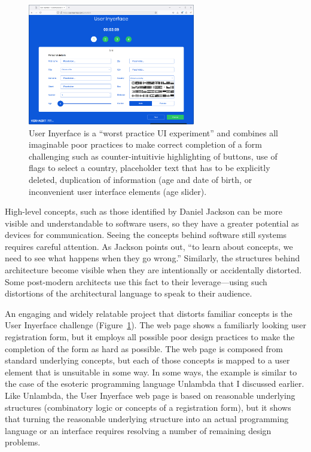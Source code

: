 \begin{figure}
\centering
\includegraphics[width=0.65\textwidth]{fig/inyerface.png}
\caption{User Inyerface is a ``worst practice UI experiment'' and combines all imaginable
poor practices to make correct completion of a form challenging such as counter-intuitivie
highlighting of buttons, use of flags to select a country, placeholder text that has to be
explicitly deleted, duplication of information (age and date of birth, or inconvenient user
interface elements (age slider).}
\label{fig:inyerface}
\end{figure}

High-level concepts, such as those identified by Daniel Jackson can be more visible and
understandable to software users, so they have a greater potential as devices for communication.
Seeing the concepts behind software still systems requires careful attention. As Jackson points
out, ``to learn about concepts, we need to see what happens when they go wrong.''
Similarly, the structures behind architecture become visible when they are intentionally or accidentally
distorted. Some post-modern architects use this fact to their leverage---using such
distortions of the architectural language to speak to their audience.

An engaging and widely relatable project that distorts familiar concepts is the User
Inyerface challenge (Figure~\ref{fig:inyerface}). The web page shows a familiarly looking
user registration form, but it employs all possible poor design practices to make the completion
of the form as hard as possible. The web page is composed from standard underlying concepts,
but each of those concepts is mapped to a user element that is unsuitable in some way.
In some ways, the example is similar to the case of the esoteric programming language Unlambda
that I discussed earlier. Like Unlambda, the User Inyerface web page is based on reasonable
underlying structures (combinatory logic or concepts of a registration form), but it shows that
turning the reasonable underlying structure into an actual programming language or an interface
requires resolving a number of remaining design problems.

